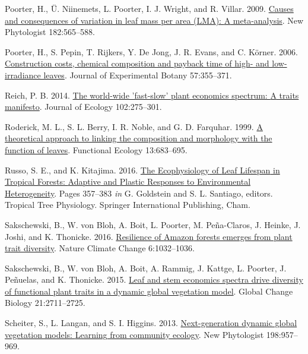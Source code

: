\documentclass[
  12pt,
]{article}
\newlength{\cslhangindent} %
\newlength{\cslentryspacingunit} %
\newenvironment{CSLReferences}[2] %
 {%
  \setlength{\parindent}{0pt} %
  \ifodd #1 %
  \let\oldpar\par %
  \def\par{\hangindent=\cslhangindent\oldpar} %
  \fi %
  \setlength{\parskip}{#2\cslentryspacingunit} %
 }%
 {} %
\begin{document}
\begin{CSLReferences}{1}{0}
\leavevmode{}%
Poorter, H., Ü. Niinemets, L. Poorter, I. J. Wright, and R. Villar. 2009. \href{https://doi.org/10.1111/j.1469-8137.2009.02830.x}{Causes and consequences of variation in leaf mass per area ({LMA}): {A} meta-analysis}. New Phytologist 182:565--588.

\leavevmode{}%
Poorter, H., S. Pepin, T. Rijkers, Y. De Jong, J. R. Evans, and C. Körner. 2006. \href{https://doi.org/10.1093/jxb/erj002}{Construction costs, chemical composition and payback time of high- and low-irradiance leaves}. Journal of Experimental Botany 57:355--371.

\leavevmode{}%
Reich, P. B. 2014. \href{https://doi.org/10.1111/1365-2745.12211}{The world-wide 'fast-slow' plant economics spectrum: {A} traits manifesto}. Journal of Ecology 102:275--301.

\leavevmode{}%
Roderick, M. L., S. L. Berry, I. R. Noble, and G. D. Farquhar. 1999. \href{https://doi.org/10.1046/j.1365-2435.1999.00368.x}{A theoretical approach to linking the composition and morphology with the function of leaves}. Functional Ecology 13:683--695.

\leavevmode{}%
Russo, S. E., and K. Kitajima. 2016. \href{https://doi.org/10.1007/978-3-319-27422-5_17}{The {Ecophysiology} of {Leaf Lifespan} in {Tropical Forests}: {Adaptive} and {Plastic Responses} to {Environmental Heterogeneity}}. Pages 357--383 \emph{in} G. Goldstein and S. L. Santiago, editors. Tropical {Tree Physiology}. {Springer International Publishing}, {Cham}.

\leavevmode{}%
Sakschewski, B., W. von Bloh, A. Boit, L. Poorter, M. Peña-Claros, J. Heinke, J. Joshi, and K. Thonicke. 2016. \href{https://doi.org/10.1038/nclimate3109}{Resilience of {Amazon} forests emerges from plant trait diversity}. Nature Climate Change 6:1032--1036.

\leavevmode{}%
Sakschewski, B., W. von Bloh, A. Boit, A. Rammig, J. Kattge, L. Poorter, J. Peñuelas, and K. Thonicke. 2015. \href{https://doi.org/10.1111/gcb.12870}{Leaf and stem economics spectra drive diversity of functional plant traits in a dynamic global vegetation model}. Global Change Biology 21:2711--2725.

\leavevmode{}%
Scheiter, S., L. Langan, and S. I. Higgins. 2013. \href{https://doi.org/10.1111/nph.12210}{Next-generation dynamic global vegetation models: {Learning} from community ecology}. New Phytologist 198:957--969.


\end{CSLReferences}
\end{document}

